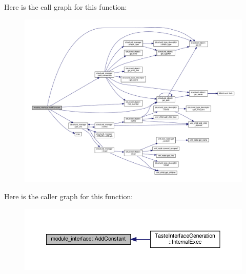 Here is the call graph for this function\+:
\nopagebreak
\begin{figure}[H]
\begin{center}
\leavevmode
\includegraphics[width=350pt]{d9/d0e/classmodule__interface_ada3f993c47781a9571fb5edd982a9af2_cgraph}
\end{center}
\end{figure}
Here is the caller graph for this function\+:
\nopagebreak
\begin{figure}[H]
\begin{center}
\leavevmode
\includegraphics[width=350pt]{d9/d0e/classmodule__interface_ada3f993c47781a9571fb5edd982a9af2_icgraph}
\end{center}
\end{figure}
\mbox{\label{classmodule__interface_a5530441acd63973aa14d4bcc27ce5a70}} 

